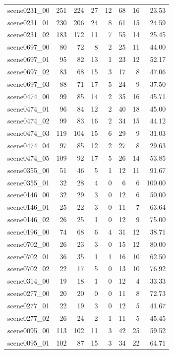 \begin{table}[t]
\begin{tabular}{lrrrrrrr}
scene0231\_00 & 251 & 224 & 27 & 12 & 68 & 16 & 23.53 \\
scene0231\_01 & 230 & 206 & 24 & 8 & 61 & 15 & 24.59 \\
scene0231\_02 & 183 & 172 & 11 & 7 & 55 & 14 & 25.45 \\
scene0697\_00 & 80 & 72 & 8 & 2 & 25 & 11 & 44.00 \\
scene0697\_01 & 95 & 82 & 13 & 1 & 23 & 12 & 52.17 \\
scene0697\_02 & 83 & 68 & 15 & 3 & 17 & 8 & 47.06 \\
scene0697\_03 & 88 & 71 & 17 & 5 & 24 & 9 & 37.50 \\
scene0474\_00 & 99 & 85 & 14 & 2 & 35 & 16 & 45.71 \\
scene0474\_01 & 96 & 84 & 12 & 2 & 40 & 18 & 45.00 \\
scene0474\_02 & 99 & 83 & 16 & 2 & 34 & 15 & 44.12 \\
scene0474\_03 & 119 & 104 & 15 & 6 & 29 & 9 & 31.03 \\
scene0474\_04 & 97 & 85 & 12 & 2 & 27 & 8 & 29.63 \\
scene0474\_05 & 109 & 92 & 17 & 5 & 26 & 14 & 53.85 \\
scene0355\_00 & 51 & 46 & 5 & 1 & 12 & 11 & 91.67 \\
scene0355\_01 & 32 & 28 & 4 & 0 & 6 & 6 & 100.00 \\
scene0146\_00 & 32 & 29 & 3 & 0 & 12 & 6 & 50.00 \\
scene0146\_01 & 25 & 22 & 3 & 0 & 11 & 7 & 63.64 \\
scene0146\_02 & 26 & 25 & 1 & 0 & 12 & 9 & 75.00 \\
scene0196\_00 & 74 & 68 & 6 & 4 & 31 & 12 & 38.71 \\
scene0702\_00 & 26 & 23 & 3 & 0 & 15 & 12 & 80.00 \\
scene0702\_01 & 36 & 35 & 1 & 1 & 16 & 10 & 62.50 \\
scene0702\_02 & 22 & 17 & 5 & 0 & 13 & 10 & 76.92 \\
scene0314\_00 & 19 & 18 & 1 & 0 & 12 & 4 & 33.33 \\
scene0277\_00 & 20 & 20 & 0 & 0 & 11 & 8 & 72.73 \\
scene0277\_01 & 22 & 19 & 3 & 0 & 12 & 5 & 41.67 \\
scene0277\_02 & 26 & 24 & 2 & 1 & 11 & 5 & 45.45 \\
scene0095\_00 & 113 & 102 & 11 & 3 & 42 & 25 & 59.52 \\
scene0095\_01 & 102 & 87 & 15 & 3 & 34 & 22 & 64.71 \\

\end{tabular}
\end{table}
